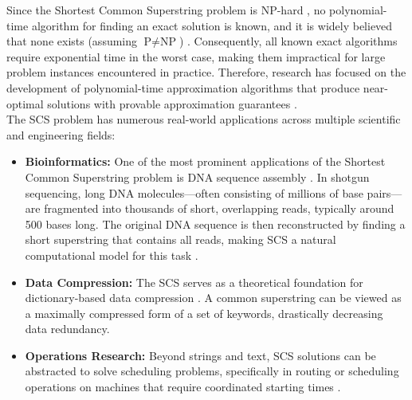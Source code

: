 Since the Shortest Common Superstring problem is NP-hard \cite{gallant1980finding}, no polynomial-time algorithm for finding an exact solution is known, and it is widely believed that none exists (assuming $\text{P} \neq \text{NP}$) \cite{garey1979computers}. Consequently, all known exact algorithms require exponential time in the worst case, making them impractical for large problem instances encountered in practice. Therefore, research has focused on the development of polynomial-time approximation algorithms that produce near-optimal solutions with provable approximation guarantees \cite{vazirani2001approximation}.\\
The SCS problem has numerous real-world applications across multiple scientific
and engineering fields:
\begin{itemize}
    \item \textbf{Bioinformatics:} One of the most prominent applications of the
    Shortest Common Superstring problem is DNA sequence assembly
    \cite{setubal1997introduction}. In shotgun sequencing, long DNA
    molecules—often consisting of millions of base pairs—are fragmented into
    thousands of short, overlapping reads, typically around 500 bases long. The
    original DNA sequence is then reconstructed by finding a short superstring
    that contains all reads, making SCS a natural computational model for this
    task \cite{peltola1984seqa}.
    \item \textbf{Data Compression:} The SCS serves as a theoretical foundation
    for dictionary-based data compression \cite{storer1982data}. A common
    superstring can be viewed as a maximally compressed form of a set of
    keywords, drastically decreasing data redundancy.
    \item \textbf{Operations Research:} Beyond strings and text, SCS solutions
    can be abstracted to solve scheduling problems, specifically in routing or
    scheduling operations on machines that require coordinated starting times
    \cite{lawler1985traveling}.
\end{itemize}
